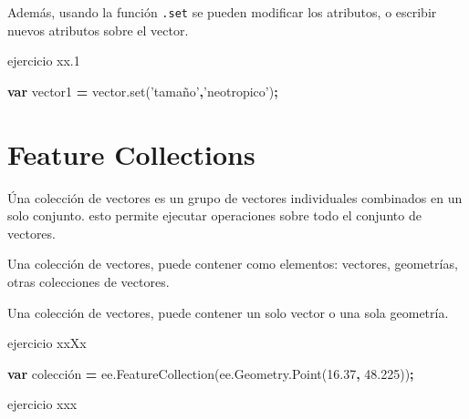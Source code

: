 \documentclass[
]{article}
\newenvironment{Shaded}{\begin{snugshade}}{\end{snugshade}}
\newcommand{\AttributeTok}[1]{\textcolor[rgb]{0.77,0.63,0.00}{#1}}
\newcommand{\FloatTok}[1]{\textcolor[rgb]{0.00,0.00,0.81}{#1}}
\newcommand{\KeywordTok}[1]{\textcolor[rgb]{0.13,0.29,0.53}{\textbf{#1}}}
\newcommand{\NormalTok}[1]{#1}
\newcommand{\OperatorTok}[1]{\textcolor[rgb]{0.81,0.36,0.00}{\textbf{#1}}}
\newcommand{\StringTok}[1]{\textcolor[rgb]{0.31,0.60,0.02}{#1}}
\newcommand{\VariableTok}[1]{\textcolor[rgb]{0.00,0.00,0.00}{#1}}
\begin{document}
Además, usando la función \texttt{.set} se pueden modificar los
atributos, o escribir nuevos atributos sobre el vector.

ejercicio xx.1

\begin{Shaded}
\begin{Highlighting}[]
\KeywordTok{var}\NormalTok{ vector1 }\OperatorTok{=} \VariableTok{vector}\NormalTok{.}\AttributeTok{set}\NormalTok{(}\StringTok{'tamaño'}\OperatorTok{,}\StringTok{'neotropico'}\NormalTok{)}\OperatorTok{;}
\end{Highlighting}
\end{Shaded}

\newpage

\hypertarget{feature-collections}{%
\section{Feature Collections}\label{feature-collections}}

Úna colección de vectores es un grupo de vectores individuales
combinados en un solo conjunto. esto permite ejecutar operaciones sobre
todo el conjunto de vectores.

\begin{tipblock}
Una colección de vectores, puede contener como elementos: vectores,
geometrías, otras colecciones de vectores.

\end{tipblock}

\begin{tipblock}
Una colección de vectores, puede contener un solo vector o una sola
geometría.

\end{tipblock}

ejercicio xxXx

\begin{Shaded}
\begin{Highlighting}[]
\KeywordTok{var}\NormalTok{ colección }\OperatorTok{=} \VariableTok{ee}\NormalTok{.}\AttributeTok{FeatureCollection}\NormalTok{(}\VariableTok{ee}\NormalTok{.}\VariableTok{Geometry}\NormalTok{.}\AttributeTok{Point}\NormalTok{(}\FloatTok{16.37}\OperatorTok{,} \FloatTok{48.225}\NormalTok{))}\OperatorTok{;}
\end{Highlighting}
\end{Shaded}

ejercicio xxx
\end{document}
